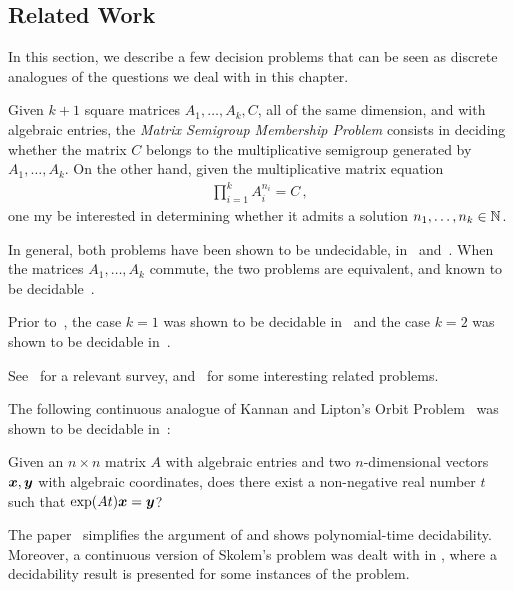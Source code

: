\subsection{Related Work}
\label{sec:lics_related_work}

In this section, we describe a few decision problems that can be seen as discrete analogues of the questions we deal with in this chapter.

Given $k+1$ square matrices $A_{1}, \ldots, A_{k}, C$, all of the same dimension, and with algebraic entries, the \emph{Matrix Semigroup Membership Problem} consists in deciding whether the matrix $C$ belongs to the multiplicative semigroup generated by $A_{1}, \ldots, A_{k}$.
On the other hand, given the multiplicative matrix equation
\begin{align*}
\prod\limits_{i=1}^{k} A_{i}^{n_{i}} = C \, ,
\end{align*}
one my be interested in determining whether it admits a solution $n_{1}, \ldots, n_{k} \in \mathbb{N}$.

In general, both problems have been shown to be undecidable, in~\cite{Paterson} and~\cite{MEHTP}.
When the matrices $A_{1}, \ldots, A_{k}$ commute, the two problems are
equivalent, and known to be decidable~\cite{MultiplicativeMatrixEquations}.

Prior to~\cite{MultiplicativeMatrixEquations}, the case $k=1$ was shown to be decidable in~\cite{KL86} and the case $k=2$ was shown to be decidable in~\cite{ABC}.

See~\cite{HalavaSurvey} for a relevant survey, and~\cite{CK05} for
some interesting related problems.

The following continuous analogue of Kannan and Lipton's Orbit
Problem~\cite{KL86} was shown to be decidable in~\cite{Hainry08}:

\begin{definition}
Given an $n \times n$ matrix $A$ with algebraic entries and two
$n$-dimensional vectors $\boldsymbol{x}, \boldsymbol{y}$ with
algebraic coordinates, does there exist a non-negative real number $t$ such
that $\exp(At) \boldsymbol{x} = \boldsymbol{y}$?
\end{definition}

The paper~\cite{ContinuousOrbitIPL} simplifies the argument of
\cite{Hainry08} and shows polynomial-time decidability. Moreover, a
continuous version of Skolem's problem was dealt with in
\cite{ContinuousSkolem}, where a decidability result is presented for
some instances of the problem.

